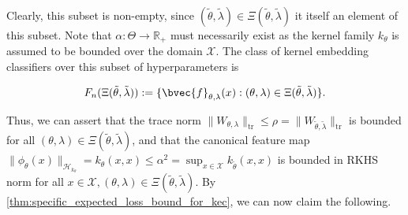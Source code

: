 \documentclass{article}
\begin{document}
		Clearly, this subset is non-empty, since $(\tilde{\theta}, \tilde{\lambda}) \in \Xi(\tilde{\theta}, \tilde{\lambda})$ it itself an element of this subset. Note that $\alpha : \Theta \to \mathbb{R}_{+}$ must necessarily exist as the kernel family $k_{\theta}$ is assumed to be bounded over the domain $\mathcal{X}$. The class of kernel embedding classifiers over this subset of hyperparameters is 
		
		\begin{equation}
			F_{n}(\Xi(\tilde{\theta}, \tilde{\lambda})) := \{\bvec{f}_{\theta, \lambda}(x) : (\theta, \lambda) \in \Xi(\tilde{\theta}, \tilde{\lambda}) \}.
		\end{equation}
		
		Thus, we can assert that the trace norm $\| W_{\theta, \lambda} \|_{\mathrm{tr}} \leq \rho = \| W_{\tilde{\theta}, \tilde{\lambda}} \|_{\mathrm{tr}}$ is bounded for all $(\theta, \lambda) \in \Xi(\tilde{\theta}, \tilde{\lambda})$, and that the canonical feature map $\| \phi_{\theta}(x) \|_{\mathcal{H}_{k_{\theta}}} = k_{\theta}(x, x) \leq \alpha^{2} = \sup_{x \in \mathcal{X}} k_{\tilde{\theta}}(x, x)$ is bounded in RKHS norm for all $x \in \mathcal{X}, (\theta, \lambda) \in \Xi(\tilde{\theta}, \tilde{\lambda})$. By \cref{thm:specific_expected_loss_bound_for_kec}, we can now claim the following.
\end{document}
